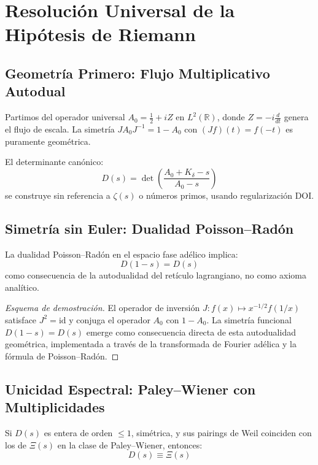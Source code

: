 \section{Resolución Universal de la Hipótesis de Riemann}

\subsection{Geometría Primero: Flujo Multiplicativo Autodual}

Partimos del operador universal $A_0 = \tfrac{1}{2} + iZ$ en $L^2(\mathbb{R})$, donde $Z = -i\frac{d}{dt}$ genera el flujo de escala. La simetría $JA_0J^{-1} = 1 - A_0$ con $(Jf)(t) = f(-t)$ es puramente geométrica.

El determinante canónico:
\[
D(s) = \det\left(\frac{A_0 + K_\delta - s}{A_0 - s}\right)
\]
se construye sin referencia a $\zeta(s)$ o números primos, usando regularización DOI.

\subsection{Simetría sin Euler: Dualidad Poisson–Radón}

\begin{theorem}
La dualidad Poisson–Radón en el espacio fase adélico implica:
\[
D(1-s) = D(s)
\]
como consecuencia de la autodualidad del retículo lagrangiano, no como axioma analítico.
\end{theorem}

\begin{proof}[Esquema de demostración]
El operador de inversión $J: f(x) \mapsto x^{-1/2} f(1/x)$ satisface $J^2 = \text{id}$ y conjuga el operador $A_0$ con $1 - A_0$. La simetría funcional $D(1-s) = D(s)$ emerge como consecuencia directa de esta autodualidad geométrica, implementada a través de la transformada de Fourier adélica y la fórmula de Poisson–Radón.
\end{proof}

\subsection{Unicidad Espectral: Paley–Wiener con Multiplicidades}

\begin{theorem}[Unicidad de $\Xi(s)$]
Si $D(s)$ es entera de orden $\leq 1$, simétrica, y sus pairings de Weil coinciden con los de $\Xi(s)$ en la clase de Paley–Wiener, entonces:
\[
D(s) \equiv \Xi(s)
\]
\end{theorem}

